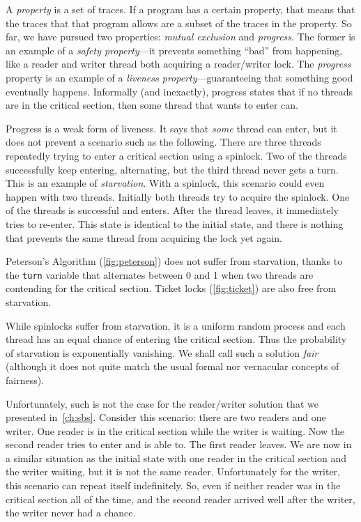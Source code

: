 \documentclass{report}
\begin{document}
A \emph{property}
%
is a set of traces.
If a program has a certain property, that means that the traces that that
program allows are a subset of the traces in the property.
So far, we have pursued two properties: \emph{mutual exclusion}
and \emph{progress}.  The former is an example of a
\emph{safety property}---it prevents something ``bad'' from
happening, like a reader and writer thread both acquiring a
reader/writer lock.
The \emph{progress} property is an example
of a \emph{liveness property}---guaranteeing that something good
eventually happens.
Informally (and inexactly), progress states that if no threads
are in the critical section, then some thread that wants to enter
can.

Progress is a weak form of liveness.  It says that \emph{some}
thread can enter, but it does not prevent a scenario such as
the following.  There are three threads repeatedly trying to
enter a critical section using a spinlock.  Two of
the threads successfully keep entering, alternating, but the third
thread never gets a turn.  This is an example of
\emph{starvation}.  With a spinlock, this scenario could
even happen with two threads.  Initially both threads
try to acquire the spinlock.  One of the threads is
successful and enters.  After the thread leaves, it immediately
tries to re-enter.  This state is identical to the initial
state, and there is nothing that prevents the same thread
from acquiring the lock yet again.

Peterson's Algorithm (\autoref{fig:peterson})
does not suffer from starvation, thanks to the \texttt{turn} variable
that alternates between 0 and 1 when two threads are contending for
the critical section.
Ticket locks (\autoref{fig:ticket}) are also free from starvation.

While spinlocks suffer from starvation, it is a uniform random
process and each thread has an equal chance of entering the critical
section.  Thus the probability of starvation is exponentially vanishing.
We shall call such a solution \emph{fair}
%
(although it does not quite
match the usual formal nor vernacular concepts of fairness).

%

Unfortunately, such is not the case for the
reader/writer solution that we presented in~\autoref{ch:sbs}.
Consider this scenario: there are two readers and one writer.  One reader
is in the critical section while the writer is waiting.  Now the
second reader tries to enter and is able to.  The first reader leaves.
We are now in a similar situation as the initial state with one reader
in the critical section and the writer waiting, but it is not the same
reader.  Unfortunately for the writer, this scenario can repeat itself
indefinitely.  So, even if neither reader was in the critical section
all of the time, and the second reader arrived well after the writer,
the writer never had a chance.
\end{document}
